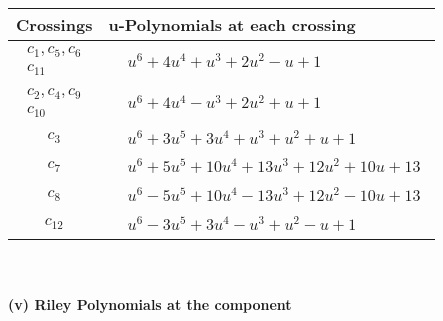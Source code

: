 \documentclass[1p]{elsarticle_modified}
\theoremstyle{definition}
\begin{document}
\begin{tabular}{m{50pt}|m{274pt}}
Crossings & \hspace{64pt}u-Polynomials at each crossing \\
\hline $$\begin{aligned}c_{1},c_{5},c_{6}\\c_{11}\end{aligned}$$&$\begin{aligned}
&u^6+4 u^4+u^3+2 u^2- u+1
\end{aligned}$\\
\hline $$\begin{aligned}c_{2},c_{4},c_{9}\\c_{10}\end{aligned}$$&$\begin{aligned}
&u^6+4 u^4- u^3+2 u^2+u+1
\end{aligned}$\\
\hline $$\begin{aligned}c_{3}\end{aligned}$$&$\begin{aligned}
&u^6+3 u^5+3 u^4+u^3+u^2+u+1
\end{aligned}$\\
\hline $$\begin{aligned}c_{7}\end{aligned}$$&$\begin{aligned}
&u^6+5 u^5+10 u^4+13 u^3+12 u^2+10 u+13
\end{aligned}$\\
\hline $$\begin{aligned}c_{8}\end{aligned}$$&$\begin{aligned}
&u^6-5 u^5+10 u^4-13 u^3+12 u^2-10 u+13
\end{aligned}$\\
\hline $$\begin{aligned}c_{12}\end{aligned}$$&$\begin{aligned}
&u^6-3 u^5+3 u^4- u^3+u^2- u+1
\end{aligned}$\\
\hline
\end{tabular}\\~\\
\newpage\renewcommand{\arraystretch}{1}
\flushleft \textbf{(v) Riley Polynomials at the component}\newline \\
\end{document}
